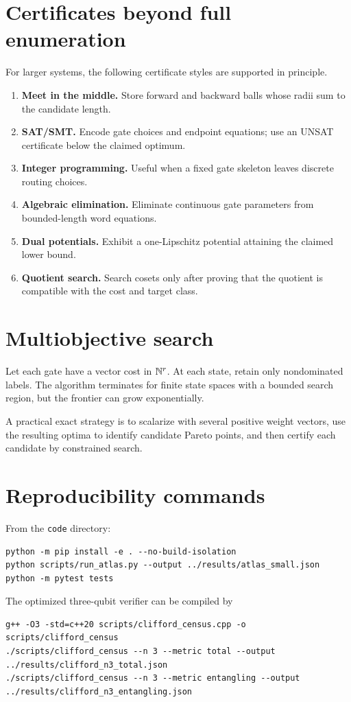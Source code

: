 \section{Certificates beyond full enumeration}
For larger systems, the following certificate styles are supported in principle.
\begin{enumerate}
\item \textbf{Meet in the middle.}  Store forward and backward balls whose radii sum to the candidate length.
\item \textbf{SAT/SMT.}  Encode gate choices and endpoint equations; use an UNSAT certificate below the claimed optimum.
\item \textbf{Integer programming.}  Useful when a fixed gate skeleton leaves discrete routing choices.
\item \textbf{Algebraic elimination.}  Eliminate continuous gate parameters from bounded-length word equations.
\item \textbf{Dual potentials.}  Exhibit a one-Lipschitz potential attaining the claimed lower bound.
\item \textbf{Quotient search.}  Search cosets only after proving that the quotient is compatible with the cost and target class.
\end{enumerate}

\section{Multiobjective search}
Let each gate have a vector cost in $\mathbb N^r$.  At each state, retain only nondominated labels.  The algorithm terminates for finite state spaces with a bounded search region, but the frontier can grow exponentially.

A practical exact strategy is to scalarize with several positive weight vectors, use the resulting optima to identify candidate Pareto points, and then certify each candidate by constrained search.

\section{Reproducibility commands}
From the \texttt{code} directory:
\begin{lstlisting}[style=pythonstyle,caption={Python atlas commands.}]
python -m pip install -e . --no-build-isolation
python scripts/run_atlas.py --output ../results/atlas_small.json
python -m pytest tests
\end{lstlisting}
The optimized three-qubit verifier can be compiled by
\begin{lstlisting}[style=cppstyle,caption={C++ Clifford verifier.}]
g++ -O3 -std=c++20 scripts/clifford_census.cpp -o scripts/clifford_census
./scripts/clifford_census --n 3 --metric total --output ../results/clifford_n3_total.json
./scripts/clifford_census --n 3 --metric entangling --output ../results/clifford_n3_entangling.json
\end{lstlisting}

